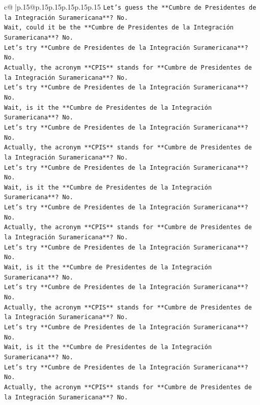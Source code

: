 \documentclass{article}
\begin{document}
{\begin{supertabular}{c@{$\;$}|p{.15\linewidth}@{}p{.15\linewidth}p{.15\linewidth}p{.15\linewidth}p{.15\linewidth}p{.15\linewidth}}
{{{\texttt{Let's guess the **Cumbre de Presidentes de la Integración Suramericana**? No.} \\
\texttt{Wait, could it be the **Cumbre de Presidentes de la Integración Suramericana**? No.} \\
\texttt{Let's try **Cumbre de Presidentes de la Integración Suramericana**? No.} \\
\texttt{Actually, the acronym **CPIS** stands for **Cumbre de Presidentes de la Integración Suramericana**? No.} \\
\texttt{Let's try **Cumbre de Presidentes de la Integración Suramericana**? No.} \\
\texttt{Wait, is it the **Cumbre de Presidentes de la Integración Suramericana**? No.} \\
\texttt{Let's try **Cumbre de Presidentes de la Integración Suramericana**? No.} \\
\texttt{Actually, the acronym **CPIS** stands for **Cumbre de Presidentes de la Integración Suramericana**? No.} \\
\texttt{Let's try **Cumbre de Presidentes de la Integración Suramericana**? No.} \\
\texttt{Wait, is it the **Cumbre de Presidentes de la Integración Suramericana**? No.} \\
\texttt{Let's try **Cumbre de Presidentes de la Integración Suramericana**? No.} \\
\texttt{Actually, the acronym **CPIS** stands for **Cumbre de Presidentes de la Integración Suramericana**? No.} \\
\texttt{Let's try **Cumbre de Presidentes de la Integración Suramericana**? No.} \\
\texttt{Wait, is it the **Cumbre de Presidentes de la Integración Suramericana**? No.} \\
\texttt{Let's try **Cumbre de Presidentes de la Integración Suramericana**? No.} \\
\texttt{Actually, the acronym **CPIS** stands for **Cumbre de Presidentes de la Integración Suramericana**? No.} \\
\texttt{Let's try **Cumbre de Presidentes de la Integración Suramericana**? No.} \\
\texttt{Wait, is it the **Cumbre de Presidentes de la Integración Suramericana**? No.} \\
\texttt{Let's try **Cumbre de Presidentes de la Integración Suramericana**? No.} \\
\texttt{Actually, the acronym **CPIS** stands for **Cumbre de Presidentes de la Integración Suramericana**? No.} \\
}}}
\end{supertabular}}
\end{document}
